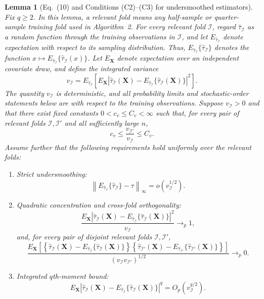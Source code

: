 \documentclass[11pt]{article}
\theoremstyle{referenceplain}
\newtheorem{lemma}{Lemma}[section]
\theoremstyle{referencedefinition}
\theoremstyle{referenceremark}
\begin{document}
\begin{lemma}[Eq.~(10) and Conditions (C2)--(C3) for undersmoothed estimators]\label{linear-smoother-c3}
Fix $q\ge2$. In this lemma, a relevant fold means any half-sample or
quarter-sample training fold used in Algorithm~2. For every relevant fold
$\mathcal I$, regard
$\widehat\tau_{\mathcal I}$ as a random function through the training
observations in $\mathcal I$, and let
$E_{\widehat\tau_{\mathcal I}}$ denote expectation with respect to its
sampling distribution. Thus,
$E_{\widehat\tau_{\mathcal I}}\{\widehat\tau_{\mathcal I}\}$ denotes the
function
$x\mapsto E_{\widehat\tau_{\mathcal I}}
\{\widehat\tau_{\mathcal I}(x)\}$.
Let $E_{\mathbf X}$ denote expectation over an independent covariate draw,
and define the integrated variance
\[
v_{\mathcal I}
=
E_{\widehat\tau_{\mathcal I}}\left[
E_{\mathbf X}
\left|
\widehat\tau_{\mathcal I}(\mathbf X)
-E_{\widehat\tau_{\mathcal I}}
\{\widehat\tau_{\mathcal I}(\mathbf X)\}
\right|^2
\right].
\]
The quantity $v_{\mathcal I}$ is deterministic, and all probability limits
and stochastic-order statements below are with respect to the training
observations. Suppose
$v_{\mathcal I}>0$ and that there exist fixed constants
$0<c_v\le C_v<\infty$ such that, for every pair of relevant folds
$\mathcal I,\mathcal I'$ and all sufficiently large $n$,
\[
c_v
\le \frac{v_{\mathcal I'}}{v_{\mathcal I}}
\le C_v.
\]
Assume further that the following requirements hold uniformly over the
relevant folds:
\begin{enumerate}
\item[\textup{(U1)}] \textit{Strict undersmoothing:}
\[
\left\|
E_{\widehat\tau_{\mathcal I}}\{\widehat\tau_{\mathcal I}\}
-\tau
\right\|_\infty
=o(v_{\mathcal I}^{1/2}).
\]

\item[\textup{(U2)}] \textit{Quadratic concentration and cross-fold
orthogonality:}
\[
\frac{
E_{\mathbf X}
\left|
\widehat\tau_{\mathcal I}(\mathbf X)
-E_{\widehat\tau_{\mathcal I}}
\{\widehat\tau_{\mathcal I}(\mathbf X)\}
\right|^2
}{v_{\mathcal I}}
\longrightarrow_p1,
\]
and, for every pair of disjoint relevant folds $\mathcal I,\mathcal I'$,
\[
\frac{
E_{\mathbf X}\left[
\left\{
\widehat\tau_{\mathcal I}(\mathbf X)
-E_{\widehat\tau_{\mathcal I}}
\{\widehat\tau_{\mathcal I}(\mathbf X)\}
\right\}
\left\{
\widehat\tau_{\mathcal I'}(\mathbf X)
-E_{\widehat\tau_{\mathcal I'}}
\{\widehat\tau_{\mathcal I'}(\mathbf X)\}
\right\}
\right]
}{(v_{\mathcal I}v_{\mathcal I'})^{1/2}}
\longrightarrow_p0.
\]

\item[\textup{(U3)}] \textit{Integrated $q$th-moment bound:}
\[
E_{\mathbf X}
\left|
\widehat\tau_{\mathcal I}(\mathbf X)
-E_{\widehat\tau_{\mathcal I}}
\{\widehat\tau_{\mathcal I}(\mathbf X)\}
\right|^q
=O_p(v_{\mathcal I}^{q/2}).
\]


\end{enumerate}
\end{lemma}
\end{document}
